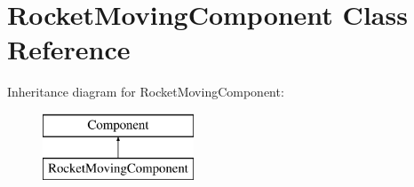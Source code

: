 \hypertarget{classRocketMovingComponent}{}\section{Rocket\+Moving\+Component Class Reference}
\label{classRocketMovingComponent}
Inheritance diagram for Rocket\+Moving\+Component\+:\begin{figure}[H]
\begin{center}
\leavevmode
\includegraphics[height=2.000000cm]{classRocketMovingComponent}
\end{center}
\end{figure}
